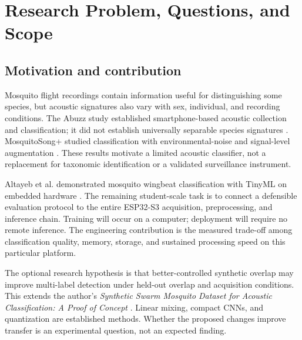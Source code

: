 \documentclass[a4paper,11pt]{article}
\begin{document}
\section{Research Problem, Questions, and Scope}
\subsection{Motivation and contribution}
Mosquito flight recordings contain information useful for distinguishing some species, but acoustic signatures also vary with sex, individual, and recording conditions. The Abuzz study established smartphone-based acoustic collection and classification; it did not establish universally separable species signatures \cite{abuzz}. MosquitoSong+ studied classification with environmental-noise and signal-level augmentation \cite{mosquitosong}. These results motivate a limited acoustic classifier, not a replacement for taxonomic identification or a validated surveillance instrument.

Altayeb et al. demonstrated mosquito wingbeat classification with TinyML on embedded hardware \cite{tinyml}. The remaining student-scale task is to connect a defensible evaluation protocol to the entire ESP32-S3 acquisition, preprocessing, and inference chain. Training will occur on a computer; deployment will require no remote inference. The engineering contribution is the measured trade-off among classification quality, memory, storage, and sustained processing speed on this particular platform.

The optional research hypothesis is that better-controlled synthetic overlap may improve multi-label detection under held-out overlap and acquisition conditions. This extends the author's \textit{Synthetic Swarm Mosquito Dataset for Acoustic Classification: A Proof of Concept} \cite{previous}. Linear mixing, compact CNNs, and quantization are established methods. Whether the proposed changes improve transfer is an experimental question, not an expected finding.
\end{document}
